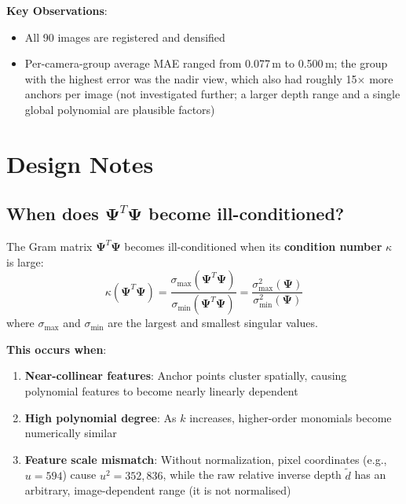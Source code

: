 \documentclass[11pt,a4paper]{article}
\begin{document}
\textbf{Key Observations}:
\begin{itemize}[noitemsep]
    \item All 90 images are registered and densified
    \item Per-camera-group average MAE ranged from 0.077\,m to 0.500\,m; the group with the highest error was the nadir view, which also had roughly 15$\times$ more anchors per image (not investigated further; a larger depth range and a single global polynomial are plausible factors)
\end{itemize}

\section{Design Notes}

\subsection{When does \texorpdfstring{$\boldsymbol{\Psi}^T\boldsymbol{\Psi}$}{Psi^T Psi} become ill-conditioned?}

The Gram matrix $\boldsymbol{\Psi}^T\boldsymbol{\Psi}$ becomes ill-conditioned when its \textbf{condition number} $\kappa$ is large:
\begin{equation}
\kappa(\boldsymbol{\Psi}^T\boldsymbol{\Psi}) = \frac{\sigma_{\max}(\boldsymbol{\Psi}^T\boldsymbol{\Psi})}{\sigma_{\min}(\boldsymbol{\Psi}^T\boldsymbol{\Psi})} = \frac{\sigma_{\max}^2(\boldsymbol{\Psi})}{\sigma_{\min}^2(\boldsymbol{\Psi})}
\end{equation}
where $\sigma_{\max}$ and $\sigma_{\min}$ are the largest and smallest singular values.

\textbf{This occurs when}:
\begin{enumerate}[noitemsep]
    \item \textbf{Near-collinear features}: Anchor points cluster spatially, causing polynomial features to become nearly linearly dependent
    \item \textbf{High polynomial degree}: As $k$ increases, higher-order monomials become numerically similar
    \item \textbf{Feature scale mismatch}: Without normalization, pixel coordinates (e.g., $u = 594$) cause $u^2 = 352,836$, while the raw relative inverse depth $\tilde{d}$ has an arbitrary, image-dependent range (it is not normalised)
\end{enumerate}
\end{document}
